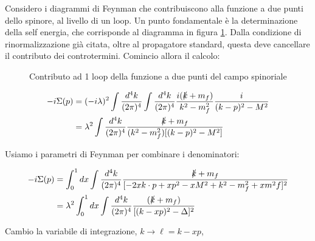 \documentclass[11pt]{report}
\begin{document}
Considero i diagrammi di Feynman che contribuiscono alla funzione a due punti dello spinore, al livello di un loop. Un punto fondamentale è la determinazione della self energia, che corrisponde al diagramma in figura \ref{fig:selfenergyfermion}. Dalla condizione di rinormalizzazione già citata, oltre al propagatore standard, questa deve cancellare il contributo dei controtermini. Comincio allora il calcolo:   

\begin{figure}
    \caption{Contributo ad 1 loop della funzione a due punti del campo spinoriale}
    \label{fig:selfenergyfermion}
    \begin{center}
    \end{center}
\end{figure}


\begin{align}
    -i\Sigma(p) &= (-i\lambda)^2 \int \frac{d^4k}{(2\pi)^4}\int \frac{d^4k}{(2\pi)^4}\frac{i(\slashed{k}+m_f)}{k^2 - m_f^2}\frac{i}{(k-p)^2 - M^2} \notag \\ 
    &= \lambda^2\int \frac{d^4k}{(2\pi)^4}\frac{\slashed{k} + m_f}{(k^2-m^2_f)[(k-p)^2-M^2]}
\end{align}

Usiamo i parametri di Feynman per combinare i denominatori: 

\begin{align}
    -i\Sigma(p) &= \int_0^1 dx \int \frac{d^4k}{(2\pi)^4}\frac{\slashed{k}+m_f}{[-2xk\cdot p + xp^2 -xM^2 +k^2 -m^2_f +xm^2f]^2} \notag \\ 
    &= \lambda^2 \int_0^1 dx \int \frac{d^4k}{(2\pi)^4}\frac{(\slashed{k} + m_f)}{[(k-xp)^2 - \Delta]^2}
\end{align}

Cambio la variabile di integrazione, \(k \to \ell = k-xp\), 
\end{document}
